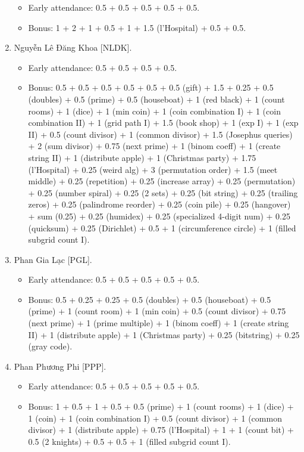 \documentclass{article}
\begin{document}
\begin{enumerate}
	\begin{itemize}
		\item Early attendance: 0.5 + 0.5 + 0.5 + 0.5 + 0.5.
		\item Bonus: 1 + 2 + 1 + 0.5 + 1 + 1.5 (l'Hospital) + 0.5 + 0.5.
	\end{itemize}
	\item {\sc Nguyễn Lê Đăng Khoa [NLDK].}
	\begin{itemize}
		\item Early attendance: 0.5 + 0.5 + 0.5 + 0.5.
		\item Bonus: 0.5 + 0.5 + 0.5 + 0.5 + 0.5 + 0.5 (gift) + 1.5 + 0.25 + 0.5 (doubles) + 0.5 (prime) + 0.5 (houseboat) + 1 (red black) + 1 (count rooms) + 1 (dice) + 1 (min coin) + 1 (coin combination I) + 1 (coin combination II) + 1 (grid path I) + 1.5 (book shop) + 1 (exp I) + 1 (exp II) + 0.5 (count divisor) + 1 (common divisor) + 1.5 (Josephus queries) + 2 (sum divisor) + 0.75 (next prime) + 1 (binom coeff) + 1 (create string II) + 1 (distribute apple) + 1 (Christmas party) + 1.75 (l'Hospital) + 0.25 (weird alg) + 3 (permutation order) + 1.5 (meet middle) + 0.25 (repetition) + 0.25 (increase array) + 0.25 (permutation) + 0.25 (number spiral) + 0.25 (2 sets) + 0.25 (bit string) + 0.25 (trailing zeros) + 0.25 (palindrome reorder) + 0.25 (coin pile) + 0.25 (hangover) + sum (0.25) + 0.25 (humidex) + 0.25 (specialized 4-digit num) + 0.25 (quicksum) + 0.25 (Dirichlet) + 0.5 + 1 (circumference circle) + 1 (filled subgrid count I).
	\end{itemize}
	\item {\sc Phan Gia Lạc [PGL].}
	\begin{itemize}
		\item Early attendance: 0.5 + 0.5 + 0.5 + 0.5 + 0.5.
		\item Bonus: 0.5 + 0.25 + 0.25 + 0.5 (doubles) + 0.5 (houseboat) + 0.5 (prime) + 1 (count room) + 1 (min coin) + 0.5 (count divisor) + 0.75 (next prime) + 1 (prime multiple) + 1 (binom coeff) + 1 (create string II) + 1 (distribute apple) + 1 (Christmas party) + 0.25 (bitstring) + 0.25 (gray code).
	\end{itemize}
	\item {\sc Phan Phương Phi [PPP].}
	\begin{itemize}
		\item Early attendance: 0.5 + 0.5 + 0.5 + 0.5 + 0.5.
		\item Bonus: 1 + 0.5 + 1 + 0.5 + 0.5 (prime) + 1 (count rooms) + 1 (dice) + 1 (coin) + 1 (coin combination I) + 0.5 (count divisor) + 1 (common divisor) + 1 (distribute apple) + 0.75 (l'Hospital) + 1 + 1 (count bit) + 0.5 (2 knights) + 0.5 + 0.5 + 1 (filled subgrid count I).

\end{itemize}
\end{enumerate}
\end{document}
